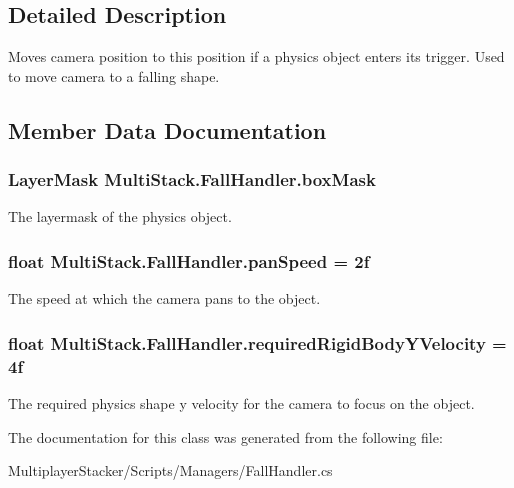 \subsection{Detailed Description}
Moves camera position to this position if a physics object enters its trigger. Used to move camera to a falling shape. 



\subsection{Member Data Documentation}
\hypertarget{class_multi_stack_1_1_fall_handler_ad7f6668311c604a6c8780f43d111b637}{}
\subsubsection[{box\+Mask}]{\setlength{\rightskip}{0pt plus 5cm}Layer\+Mask Multi\+Stack.\+Fall\+Handler.\+box\+Mask}\label{class_multi_stack_1_1_fall_handler_ad7f6668311c604a6c8780f43d111b637}


The layermask of the physics object. 

\hypertarget{class_multi_stack_1_1_fall_handler_a8bfc0ce850601f85f1d5124f31442bce}{}
\subsubsection[{pan\+Speed}]{\setlength{\rightskip}{0pt plus 5cm}float Multi\+Stack.\+Fall\+Handler.\+pan\+Speed = 2f}\label{class_multi_stack_1_1_fall_handler_a8bfc0ce850601f85f1d5124f31442bce}


The speed at which the camera pans to the object. 

\hypertarget{class_multi_stack_1_1_fall_handler_a29322f628b3b2755771970610f11c382}{}
\subsubsection[{required\+Rigid\+Body\+Y\+Velocity}]{\setlength{\rightskip}{0pt plus 5cm}float Multi\+Stack.\+Fall\+Handler.\+required\+Rigid\+Body\+Y\+Velocity = 4f}\label{class_multi_stack_1_1_fall_handler_a29322f628b3b2755771970610f11c382}


The required physics shape y velocity for the camera to focus on the object. 



The documentation for this class was generated from the following file\+:\begin{DoxyCompactItemize}
\item 
Multiplayer\+Stacker/\+Scripts/\+Managers/Fall\+Handler.\+cs\end{DoxyCompactItemize}
